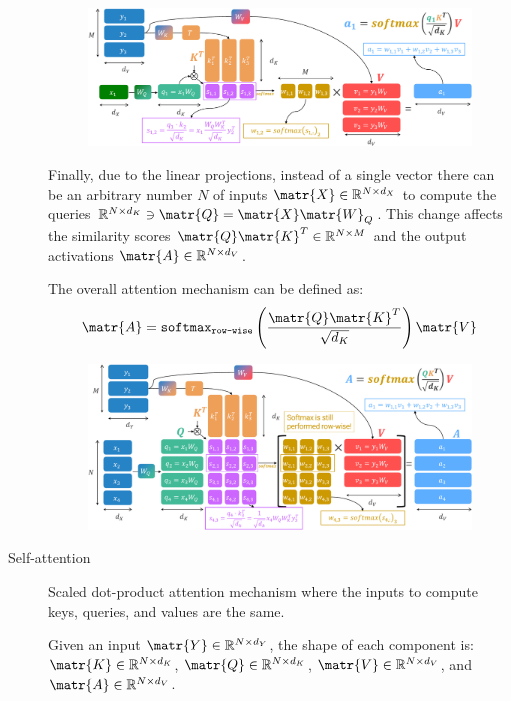\begin{description}
        \begin{figure}[H]
            \centering
            \includegraphics[width=0.8\linewidth]{./img/_scaled_dot_attention.pdf}
        \end{figure}

        Finally, due to the linear projections, instead of a single vector there can be an arbitrary number $N$ of inputs $\matr{X} \in \mathbb{R}^{N \times d_X}$ to compute the queries $\mathbb{R}^{N \times d_K} \ni \matr{Q} = \matr{X} \matr{W}_Q$. This change affects the similarity scores $\matr{Q}\matr{K}^T \in \mathbb{R}^{N \times M}$ and the output activations $\matr{A} \in \mathbb{R}^{N \times d_V}$. 

        The overall attention mechanism can be defined as:
        \[ \matr{A} = \texttt{softmax}_\texttt{row-wise}\left( \frac{\matr{Q}\matr{K}^T}{\sqrt{d_K}} \right) \matr{V} \]

        \begin{figure}[H]
            \centering
            \includegraphics[width=0.8\linewidth]{./img/_scaled_dot_attention_multi_q.pdf}
        \end{figure}

    \item[Self-attention] 
        Scaled dot-product attention mechanism where the inputs to compute keys, queries, and values are the same.

        Given an input $\matr{Y} \in \mathbb{R}^{N \times d_Y}$, the shape of each component is: $\matr{K} \in \mathbb{R}^{N \times d_K}$, $\matr{Q} \in \mathbb{R}^{N \times d_K}$, $\matr{V} \in \mathbb{R}^{N \times d_V}$, and $\matr{A} \in \mathbb{R}^{N \times d_V}$.


\end{description}
